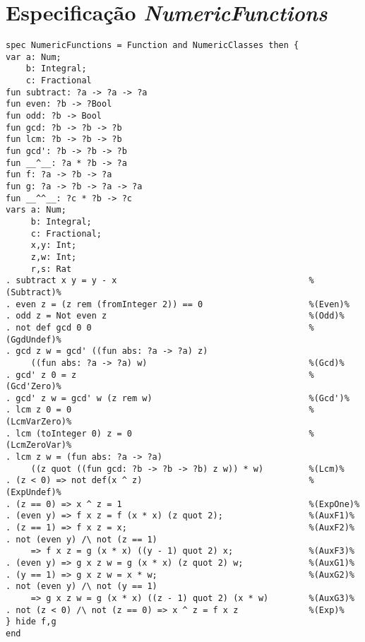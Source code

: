 \section{Especificação \textit{NumericFunctions}}
\label{appendix:lazySpec:numericFunctions}
\begin{Verbatim}
spec NumericFunctions = Function and NumericClasses then {
var a: Num;
    b: Integral;
    c: Fractional
fun subtract: ?a -> ?a -> ?a
fun even: ?b -> ?Bool
fun odd: ?b -> Bool
fun gcd: ?b -> ?b -> ?b
fun lcm: ?b -> ?b -> ?b
fun gcd': ?b -> ?b -> ?b
fun __^__: ?a * ?b -> ?a
fun f: ?a -> ?b -> ?a
fun g: ?a -> ?b -> ?a -> ?a
fun __^^__: ?c * ?b -> ?c
vars a: Num;
     b: Integral;
     c: Fractional;
     x,y: Int;
     z,w: Int;
     r,s: Rat
. subtract x y = y - x                                      %(Subtract)%
. even z = (z rem (fromInteger 2)) == 0                     %(Even)%
. odd z = Not even z                                        %(Odd)%
. not def gcd 0 0                                           %(GgdUndef)%
. gcd z w = gcd' ((fun abs: ?a -> ?a) z)
     ((fun abs: ?a -> ?a) w)                                %(Gcd)%
. gcd' z 0 = z                                              %(Gcd'Zero)%
. gcd' z w = gcd' w (z rem w)                               %(Gcd')%
. lcm z 0 = 0                                               %(LcmVarZero)%
. lcm (toInteger 0) z = 0                                   %(LcmZeroVar)%
. lcm z w = (fun abs: ?a -> ?a)
     ((z quot ((fun gcd: ?b -> ?b -> ?b) z w)) * w)         %(Lcm)%
. (z < 0) => not def(x ^ z)                                 %(ExpUndef)%
. (z == 0) => x ^ z = 1                                     %(ExpOne)%
. (even y) => f x z = f (x * x) (z quot 2);                 %(AuxF1)%
. (z == 1) => f x z = x;                                    %(AuxF2)%
. not (even y) /\ not (z == 1)
     => f x z = g (x * x) ((y - 1) quot 2) x;               %(AuxF3)%
. (even y) => g x z w = g (x * x) (z quot 2) w;             %(AuxG1)%
. (y == 1) => g x z w = x * w;                              %(AuxG2)%
. not (even y) /\ not (y == 1)
     => g x z w = g (x * x) ((z - 1) quot 2) (x * w)        %(AuxG3)%
. not (z < 0) /\ not (z == 0) => x ^ z = f x z              %(Exp)%
} hide f,g
end
\end{Verbatim}

